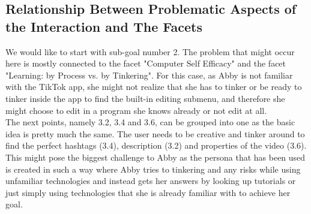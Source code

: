 \documentclass[12pt, letterpaper]{article}
\begin{document}
\subsection{Relationship Between Problematic Aspects of the Interaction and The Facets}
We would like to start with sub-goal number 2. The problem that might occur here is mostly connected to the facet "Computer Self Efficacy" and the facet "Learning: by Process vs. by Tinkering". For this case, as Abby is not familiar with the TikTok app, she might not realize that she has to tinker or be ready to tinker inside the app to find the built-in editing submenu, and therefore she might choose to edit in a program she knows already or not edit at all.\\
The next points, namely 3.2, 3.4 and 3.6, can be grouped into one as the basic idea is pretty much the same. The user needs to be creative and tinker around to find the perfect hashtags (3.4), description (3.2) and properties of the video (3.6). This might pose the biggest challenge to Abby as the persona that has been used is created in such a way where Abby tries to tinkering and any risks while using unfamiliar technologies and instead gets her answers by looking up tutorials or just simply using technologies that she is already familiar with to achieve her goal.\newpage
\end{document}
